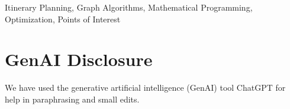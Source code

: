 \documentclass[conference]{IEEEtran}
\begin{document}
\begin{IEEEkeywords}
Itinerary Planning, Graph Algorithms, Mathematical Programming, Optimization, Points of Interest
\end{IEEEkeywords}









\pagebreak

\section*{GenAI Disclosure}
We have used the generative artificial intelligence (GenAI) tool ChatGPT for help in paraphrasing and small edits.

%


\end{document}
